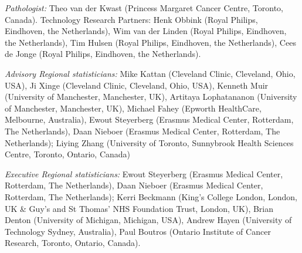 \textit{Pathologist:} Theo van der Kwast (Princess Margaret Cancer Centre, Toronto, Canada). 
Technology Research Partners: Henk Obbink (Royal Philips, Eindhoven, the Netherlands), Wim van der Linden (Royal Philips, Eindhoven, the Netherlands), Tim Hulsen (Royal Philips, Eindhoven, the Netherlands), Cees de Jonge (Royal Philips, Eindhoven, the Netherlands).

\textit{Advisory Regional statisticians:} Mike Kattan (Cleveland Clinic, Cleveland, Ohio, USA), Ji Xinge (Cleveland Clinic, Cleveland, Ohio, USA), Kenneth Muir (University of Manchester, Manchester, UK), Artitaya Lophatananon (University of Manchester, Manchester, UK), Michael Fahey (Epworth HealthCare, Melbourne, Australia), Ewout Steyerberg (Erasmus Medical Center, Rotterdam, The Netherlands), Daan Nieboer (Erasmus Medical Center, Rotterdam, The Netherlands); Liying Zhang (University of Toronto, Sunnybrook Health Sciences Centre, Toronto, Ontario, Canada)

\textit{Executive Regional statisticians:} Ewout Steyerberg (Erasmus Medical Center, Rotterdam, The Netherlands), Daan Nieboer (Erasmus Medical Center, Rotterdam, The Netherlands); Kerri Beckmann (King's College London, London, UK \& Guy’s and St Thomas’ NHS Foundation Trust, London, UK), Brian Denton (University of Michigan, Michigan, USA), Andrew Hayen (University of Technology Sydney, Australia), Paul Boutros (Ontario Institute of Cancer Research, Toronto, Ontario, Canada).

